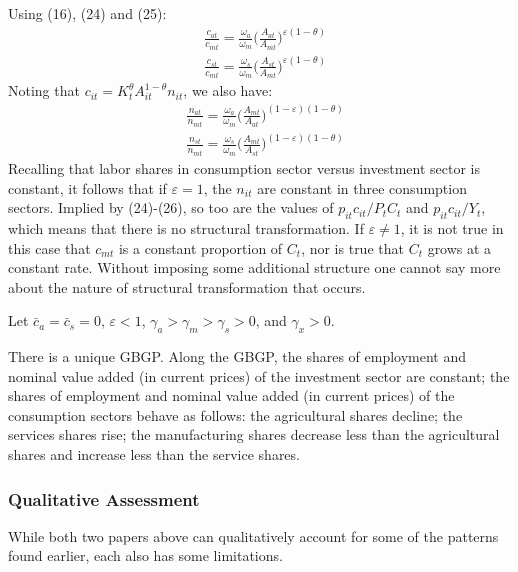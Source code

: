\documentclass{article}
\begin{document}
    Using (16), (24) and (25):
    \begin{align}
        &\frac{c_{at}}{c_{mt}}=\frac{\omega_a}{\omega_m} \biggl( \frac{A_{at}}{A_{mt}} \biggr)^{\varepsilon (1-\theta)}\\
        &\frac{c_{st}}{c_{mt}}=\frac{\omega_s}{\omega_m} \biggl( \frac{A_{st}}{A_{mt}} \biggr)^{\varepsilon (1-\theta)}
    \end{align}
    Noting that $c_{it} = K_t^\theta A^{1−\theta}_{it} n_{it}$, we also have:
    \begin{align}
        &\frac{n_{at}}{n_{mt}}=\frac{\omega_a}{\omega_m} \biggl( \frac{A_{mt}}{A_{at}} \biggr)^{(1-\varepsilon) (1-\theta)}\\
        &\frac{n_{st}}{n_{mt}}=\frac{\omega_s}{\omega_m} \biggl( \frac{A_{mt}}{A_{st}} \biggr)^{(1-\varepsilon) (1-\theta)}
    \end{align}
    Recalling that labor shares in consumption sector versus investment sector is constant, it follows that if $\varepsilon=1$, the $n_{it}$ are constant in three consumption sectors. Implied by (24)-(26), so too are the values of $p_{it}c_{it}/P_tC_t$ and $p_{it}c_{it}/Y_t$, which means that there is no structural transformation. If $\varepsilon \neq 1$, it is not true in this case that $c_{mt}$ is a constant proportion of $C_t$, nor is true that $C_t$ grows at a constant rate. Without imposing some additional structure one cannot say more about the nature of structural transformation that occurs. 
    
    \begin{pro}
        Let $\bar{c}_a = \bar{c}_s = 0$, $\varepsilon < 1$, $\gamma_a > \gamma_m > \gamma_s > 0$, and $\gamma_x > 0$. 
        
        There is a unique GBGP. Along the GBGP, the shares of employment and nominal value added (in current prices) of the investment sector are constant; the shares of employment and nominal value added (in current prices) of the consumption sectors behave as follows: the agricultural shares decline; the services shares rise; the manufacturing shares decrease less than the agricultural shares and increase less than the service shares.
    \end{pro}

    \subsubsection{Qualitative Assessment}
    While both two papers above can qualitatively account for some of the patterns found earlier, each also has some limitations.
\end{document}
